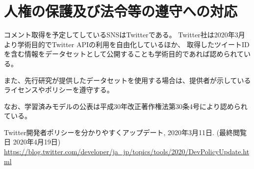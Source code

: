 
\section{人権の保護及び法令等の遵守への対応}

コメント取得を予定してしているSNSはTwitterである。
Twitter社は2020年3月より学術目的でTwitter APIの利用を自由化しているほか、
取得したツイートIDを含む情報をデータセットとして公開することも学術目的であれば認められている\cite{twitter_2020}。

また、先行研究が提供したデータセットを使用する場合は、提供者が示しているライセンスやポリシーを遵守する。

なお、学習済みモデルの公表は平成30年改正著作権法第30条4号により認められている。


\vspace{1cm}
{\footnotesize
	\begin{thebibliography}{99}
		\setcounter{enumiv}{11}
		 Twitter開発者ポリシーを分かりやすくアップデート, 2020年3月11日. (最終閲覧日 2020年4月19日) \url{https://blog.twitter.com/developer/ja_jp/topics/tools/2020/DevPolicyUpdate.html}
	\end{thebibliography}
}



